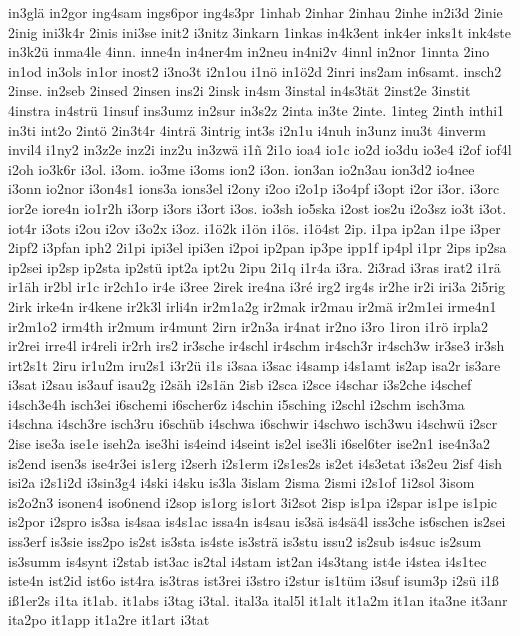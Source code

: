 {in3glä
in2gor
ing4sam
ings6por
ing4s3pr
1inhab
2inhar
2inhau
2inhe
in2i3d
2inie
2inig
ini3k4r
2inis
ini3se
init2
i3nitz
3inkarn
1inkas
in4k3ent
ink4er
inks1t
ink4ste
in3k2ü
inma4le
4inn.
inne4n
in4ner4m
in2neu
in4ni2v
4innl
in2nor
1innta
2ino
in1od
in3ols
in1or
inost2
i3no3t
i2n1ou
i1nö
in1ö2d
2inri
ins2am
in6samt.
insch2
2inse.
in2seb
2insed
2insen
ins2i
2insk
in4sm
3instal
in4s3tät
2inst2e
3instit
4instra
in4strü
1insuf
ins3umz
in2sur
in3s2z
2inta
in3te
2inte.
1integ
2inth
inthi1
in3ti
int2o
2intö
2in3t4r
4inträ
3intrig
int3s
i2n1u
i4nuh
in3unz
inu3t
4inverm
invil4
i1ny2
in3z2e
inz2i
inz2u
in3zwä
i1ñ
2i1o
ioa4
io1c
io2d
io3du
io3e4
i2of
iof4l
i2oh
io3k6r
i3ol.
i3om.
io3me
i3oms
ion2
i3on.
ion3an
io2n3au
ion3d2
io4nee
i3onn
io2nor
i3on4s1
ions3a
ions3el
i2ony
i2oo
i2o1p
i3o4pf
i3opt
i2or
i3or.
i3orc
ior2e
iore4n
io1r2h
i3orp
i3ors
i3ort
i3os.
io3sh
io5ska
i2ost
ios2u
i2o3sz
io3t
i3ot.
iot4r
i3ots
i2ou
i2ov
i3o2x
i3oz.
i1ö2k
i1ön
i1ös.
i1ö4st
2ip.
i1pa
ip2an
i1pe
i3per
2ipf2
i3pfan
iph2
2i1pi
ipi3el
ipi3en
i2poi
ip2pan
ip3pe
ipp1f
ip4pl
i1pr
2ips
ip2sa
ip2sei
ip2sp
ip2sta
ip2stü
ipt2a
ipt2u
2ipu
2i1q
i1r4a
i3ra.
2i3rad
i3ras
irat2
i1rä
ir1äh
ir2bl
ir1c
ir2ch1o
ir4e
i3ree
2irek
ire4na
i3ré
irg2
irg4s
ir2he
ir2i
iri3a
2i5rig
2irk
irke4n
ir4kene
ir2k3l
irli4n
ir2m1a2g
ir2mak
ir2mau
ir2mä
ir2m1ei
irme4n1
ir2m1o2
irm4th
ir2mum
ir4munt
2irn
ir2n3a
ir4nat
ir2no
i3ro
1iron
i1rö
irpla2
ir2rei
irre4l
ir4reli
ir2rh
irs2
ir3sche
ir4schl
ir4schm
ir4sch3r
ir4sch3w
ir3se3
ir3sh
irt2s1t
2iru
ir1u2m
iru2s1
i3r2ü
i1s
i3saa
i3sac
i4samp
i4s1amt
is2ap
isa2r
is3are
i3sat
i2sau
is3auf
isau2g
i2säh
i2s1än
2isb
i2sca
i2sce
i4schar
i3s2che
i4schef
i4sch3e4h
isch3ei
i6schemi
i6scher6z
i4schin
i5sching
i2schl
i2schm
isch3ma
i4schna
i4sch3re
isch3ru
i6schüb
i4schwa
i6schwir
i4schwo
isch3wu
i4schwü
i2scr
2ise
ise3a
ise1e
iseh2a
ise3hi
is4eind
i4seint
is2el
ise3li
i6sel6ter
ise2n1
ise4n3a2
is2end
isen3s
ise4r3ei
is1erg
i2serh
i2s1erm
i2s1es2s
is2et
i4s3etat
i3s2eu
2isf
4ish
isi2a
i2s1i2d
i3sin3g4
i4ski
i4sku
is3la
3islam
2isma
2ismi
i2s1of
1i2sol
3isom
is2o2n3
isonen4
iso6nend
i2sop
is1org
is1ort
3i2sot
2isp
is1pa
i2spar
is1pe
is1pic
is2por
i2spro
is3sa
is4saa
is4s1ac
issa4n
is4sau
is3sä
is4sä4l
iss3che
is6schen
is2sei
iss3erf
is3sie
iss2po
is2st
is3sta
is4ste
is3strä
is3stu
issu2
is2sub
is4suc
is2sum
is3summ
is4synt
i2stab
ist3ac
is2tal
i4stam
ist2an
i4s3tang
ist4e
i4stea
i4s1tec
iste4n
ist2id
ist6o
ist4ra
is3tras
ist3rei
i3stro
i2stur
is1tüm
i3suf
isum3p
i2sü
i1ß
iß1er2s
i1ta
it1ab.
it1abs
i3tag
i3tal.
ital3a
ital5l
it1alt
it1a2m
it1an
ita3ne
it3anr
ita2po
it1app
it1a2re
it1art
i3tat
}
